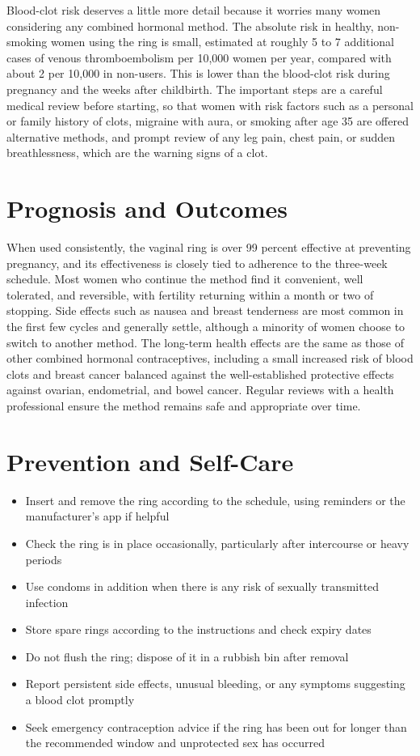 Blood-clot risk deserves a little more detail because it worries many women considering any combined hormonal method. The absolute risk in healthy, non-smoking women using the ring is small, estimated at roughly 5 to 7 additional cases of venous thromboembolism per 10,000 women per year, compared with about 2 per 10,000 in non-users. This is lower than the blood-clot risk during pregnancy and the weeks after childbirth. The important steps are a careful medical review before starting, so that women with risk factors such as a personal or family history of clots, migraine with aura, or smoking after age 35 are offered alternative methods, and prompt review of any leg pain, chest pain, or sudden breathlessness, which are the warning signs of a clot.

\section*{Prognosis and Outcomes}
When used consistently, the vaginal ring is over 99 percent effective at preventing pregnancy, and its effectiveness is closely tied to adherence to the three-week schedule. Most women who continue the method find it convenient, well tolerated, and reversible, with fertility returning within a month or two of stopping. Side effects such as nausea and breast tenderness are most common in the first few cycles and generally settle, although a minority of women choose to switch to another method. The long-term health effects are the same as those of other combined hormonal contraceptives, including a small increased risk of blood clots and breast cancer balanced against the well-established protective effects against ovarian, endometrial, and bowel cancer. Regular reviews with a health professional ensure the method remains safe and appropriate over time.

\section*{Prevention and Self-Care}
\begin{itemize}
    \item Insert and remove the ring according to the schedule, using reminders or the manufacturer's app if helpful
    \item Check the ring is in place occasionally, particularly after intercourse or heavy periods
    \item Use condoms in addition when there is any risk of sexually transmitted infection
    \item Store spare rings according to the instructions and check expiry dates
    \item Do not flush the ring; dispose of it in a rubbish bin after removal
    \item Report persistent side effects, unusual bleeding, or any symptoms suggesting a blood clot promptly
    \item Seek emergency contraception advice if the ring has been out for longer than the recommended window and unprotected sex has occurred
\end{itemize}

